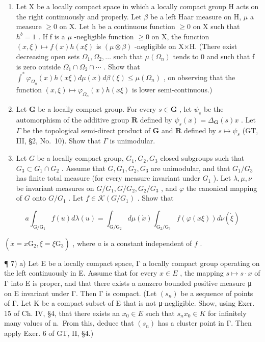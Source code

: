 \begin{enumerate}
\def\labelenumi{\arabic{enumi})}
\setcounter{enumi}{3}
\item
  Let X be a locally compact space in which a locally compact group H acts on the right continuously and properly. Let \(\beta\) be a left Haar measure on H, \(\mu\) a measure \(\geqslant0\) on X. Let h be a continuous function \(\geqslant0\) on X such that \(h^{b}=1\) . If f is a \(\mu\) -negligible function \(\geqslant0\) on X, the function \((x,\xi)\mapsto f(x)h(x\xi)\) is \((\mu\otimes\beta)\) -negligible on X×H. (There exist decreasing open sets \(\Omega_{1},\Omega_{2},\ldots\) such that \(\mu(\Omega_{n})\) tends to 0 and such that f is zero outside \(\Omega_{1}\cap\Omega_{2}\cap\cdots\) . Show that \(\int^{*}\varphi_{\Omega_{n}}(x)h(x\xi)d\mu(x)d\beta(\xi)\leqslant\mu(\Omega_{n})\) , on observing that the function \((x,\xi)\mapsto\varphi_{\Omega_{n}}(x)h(x\xi)\) is lower semi-continuous.)
\item
  Let \(\mathbf{G}\) be a locally compact group. For every \(s \in \mathbf{G}\) , let \(\psi_s\) be the automorphism of the additive group \(\mathbf{R}\) defined by \(\psi_s(x) = \Delta_{\mathbf{G}}(s)x\) . Let \(\Gamma\) be the topological semi-direct product of \(\mathbf{G}\) and \(\mathbf{R}\) defined by \(s \mapsto \psi_s\) (GT, III, §2, No.~10). Show that \(\Gamma\) is unimodular.
\item
  Let \(G\) be a locally compact group, \(G_1, G_2, G_3\) closed subgroups such that \(G_3 \subset G_1 \cap G_2\) . Assume that \(G, G_1, G_2, G_3\) are unimodular, and that \(G_1 / G_3\) has finite total measure (for every measure invariant under \(G_1\) ). Let \(\lambda, \mu, \nu\) be invariant measures on \(G / G_1, G / G_2, G_2 / G_3\) , and \(\varphi\) the canonical mapping of \(G\) onto \(G / G_1\) . Let \(f \in \mathcal{K}(G / G_1)\) . Show that
\end{enumerate}

\[
a \int_ {\mathrm{G} / \mathrm{G} _ {1}} f (u) d \lambda (u) = \int_ {\mathrm{G} / \mathrm{G} _ {2}} d \mu (\dot {x}) \int_ {\mathrm{G} _ {2} / \mathrm{G} _ {3}} f (\varphi (x \xi)) d \nu (\dot {\xi})
\]

\((\dot{x} = x\mathrm{G}_{2}, \dot{\xi} = \xi \mathrm{G}_{3})\) , where \(a\) is a constant independent of \(f\) .

¶ 7) a) Let E be a locally compact space, Γ a locally compact group operating on the left continuously in E. Assume that for every \(x \in E\) , the mapping \(s \mapsto s \cdot x\) of Γ into E is proper, and that there exists a nonzero bounded positive measure μ on E invariant under Γ. Then Γ is compact. (Let \((s_n)\) be a sequence of points of Γ. Let K be a compact subset of E that is not μ-negligible. Show, using Exer. 15 of Ch. IV, §4, that there exists an \(x_0 \in E\) such that \(s_n x_0 \in K\) for infinitely many values of n.~From this, deduce that \((s_n)\) has a cluster point in Γ. Then apply Exer. 6 of GT, II, §4.)

